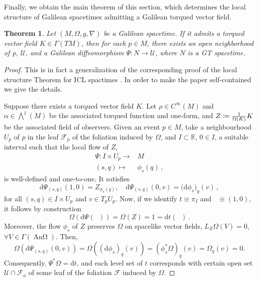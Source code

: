 \documentclass[12pt]{article}
\newcommand{\diff}{\mathrm{d}}
\newcommand{\dt}{\diff t}
\newcommand{\coloneq}{\vcentcolon\mathrel{\mkern -1.2mu}\mathrel{=}}
\newcommand{\spacetime}{(M,\Omega,g,\nabla)}
\DeclareMathOperator{\pt}{\partial_t}
\DeclareMathOperator{\An}{\text{An}\Omega}
\newtheorem{theor}[defi]{Theorem}
\def\R{\mathbb R}
\def\U{\mathcal U}
\begin{document}
Finally, we obtain the main theorem of this section, which determines the local structure of Galilean spacetimes admitting a Galilean torqued vector field.
\begin{theor}\label{theor:local structure torqued}
    Let $\spacetime$ be a Galilean spacetime. %
    If it admits a torqued vector field $K\in \Gamma(TM)$, then for each $p\in M$, there exists an open neighborhood of p, $\U$, and a Galilean diffeomorphism $\Psi\colon N \to \U$, where $N$ is a GT spacetime. 
\end{theor}
\begin{proof} 
    This is in fact a generalization of the corresponding proof of the local structure Theorem for ICL spactimes \cite[Th. 12]{GGRW}. In order to
make the paper self-contained we give the details.
    
    Suppose there exists a torqued vector field $K$. Let $\rho\in C^\infty(M)$ and $\alpha \in \bigwedge^1(M)$ be the associated torqued function and one-form, and $Z\coloneq \frac{1}{\Omega(K)} K$ be the associated field of observers. Given an event $p\in M$, take a neighbourhood $U_p$ of $p$ in the leaf $\mathcal{F}_p$ of the foliation induced by $\Omega$, and $I\subset \R$, $0\in I$, a suitable interval such that the local flow of $Z$,
    \[
    \begin{split}
        \Psi\colon I \times U_p \to{}& M\\
        (s,q) \longmapsto{}& \phi_s(q)\,,
    \end{split}
    \]
    is well-defined and one-to-one. It satisfies
    \[
        \diff \Psi_{(s,q)}(1,0) = Z_{\phi_s(q)}, \quad \diff \Psi_{(s,q)}(0,v) = \big(\diff \phi_s\big)_q(v)\,,
    \]
    for all $(s,q) \in I\times U_p$ and $v\in T_pU_p$. Now, if we identify $t\equiv \pi_I$ and $\pt \equiv (1,0)$, it follows by construction
    \[
        \Omega(\diff \Psi(\pt)) = \Omega (Z) = 1 = \dt (\pt)\,.
    \]
    Moreover, the flow $\phi_s$ of $Z$ preserves $\Omega$ on spacelike vector fields, $L_Z \Omega(V) = 0$, $\forall V\in \Gamma(\An)$. Then,
    $$
        \Omega\left(\diff \Psi_{(s, q)}(0, v)\right)=\Omega\left((\diff \phi_s)_q(v)\right)=(\phi_s^* \Omega)_q(v)=\Omega_q(v)=0 .
    $$
    Consequently, $\Psi^* \Omega=\dt$, and each level set of $t$ corresponds with certain open set $\mathcal{U} \cap \mathcal{F}_a$ of some leaf of the foliation $\mathcal{F}$ induced by $\Omega$.
    

\end{proof}
\end{document}
